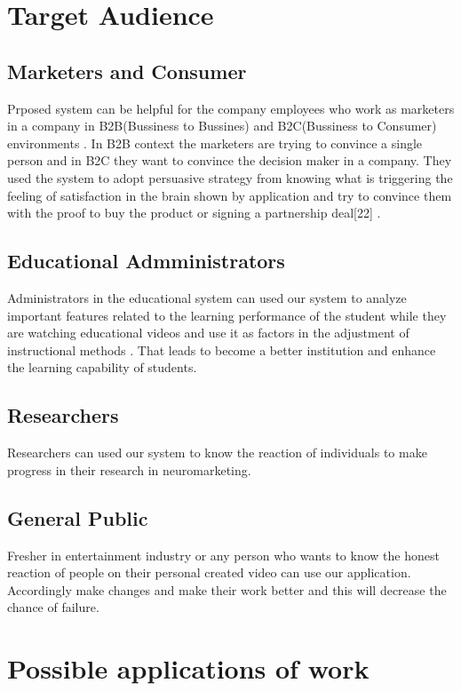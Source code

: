 \documentclass[a4paper, 12pt, oneside]{uet_thesis}
\begin{document}
\chapter{Target Audience}
\section{Marketers and Consumer}
Prposed system can be helpful for the company employees who work as marketers in a company in B2B(Bussiness to Bussines) and B2C(Bussiness to Consumer) environments \cite{b21}. In B2B context the marketers are trying to convince a single person and in B2C they want to convince the decision maker in a company. They used the system to adopt persuasive strategy from knowing what is triggering the feeling of satisfaction in the brain shown by application and try to convince them with the proof to buy the product or signing a partnership deal[22] .   

\section{Educational Admministrators}

Administrators in the educational system can used our system to analyze important features related to the learning performance of the student while they are watching educational videos and use it as factors in the adjustment of instructional methods \cite{b23}. That leads to become a better institution and enhance the learning capability of students. 

\section{Researchers}
Researchers can used our system to know the reaction of individuals to make progress in their research in neuromarketing.

\section{General Public}
Fresher in entertainment industry or any person who wants to know the honest reaction of people on their personal created video can use our application. Accordingly make changes and make their work better and this will decrease the chance of failure. 

\newpage
\chapter{Possible applications of work}
\end{document}
